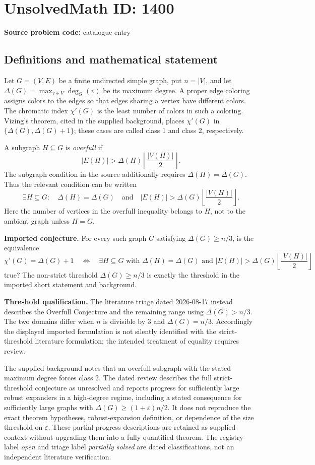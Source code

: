 \documentclass[11pt]{article}
\begin{document}
\section*{UnsolvedMath ID: 1400}
\textbf{Source problem code:} catalogue entry
\subsection{Definitions and mathematical statement}
Let $G=(V,E)$ be a finite undirected simple graph, put $n=|V|$, and let $\Delta(G)=\max_{v\in V}\deg_G(v)$ be its maximum degree. A proper edge coloring assigns colors to the edges so that edges sharing a vertex have different colors. The chromatic index $\chi'(G)$ is the least number of colors in such a coloring. Vizing's theorem, cited in the supplied background, places $\chi'(G)$ in $\{\Delta(G),\Delta(G)+1\}$; these cases are called class 1 and class 2, respectively.

A subgraph $H\subseteq G$ is \emph{overfull} if
\[
 |E(H)|>\Delta(H)\left\lfloor\frac{|V(H)|}{2}\right\rfloor.
\]
The subgraph condition in the source additionally requires $\Delta(H)=\Delta(G)$. Thus the relevant condition can be written
\[
 \exists H\subseteq G:\quad \Delta(H)=\Delta(G)
 \quad\text{and}\quad
 |E(H)|>\Delta(G)\left\lfloor\frac{|V(H)|}{2}\right\rfloor.
\]
Here the number of vertices in the overfull inequality belongs to $H$, not to the ambient graph unless $H=G$.

\textbf{Imported conjecture.} For every such graph $G$ satisfying $\Delta(G)\geq n/3$, is the equivalence
\[
 \chi'(G)=\Delta(G)+1
 \quad\Longleftrightarrow\quad
 \exists H\subseteq G\text{ with }\Delta(H)=\Delta(G)
 \text{ and }|E(H)|>\Delta(G)\left\lfloor\frac{|V(H)|}{2}\right\rfloor
\]
true? The non-strict threshold $\Delta(G)\geq n/3$ is exactly the threshold in the imported short statement and background.

\textbf{Threshold qualification.} The literature triage dated 2026-08-17 instead describes the Overfull Conjecture and the remaining range using $\Delta(G)>n/3$. The two domains differ when $n$ is divisible by $3$ and $\Delta(G)=n/3$. Accordingly the displayed imported formulation is not silently identified with the strict-threshold literature formulation; the intended treatment of equality requires review.

The supplied background notes that an overfull subgraph with the stated maximum degree forces class 2. The dated review describes the full strict-threshold conjecture as unresolved and reports progress for sufficiently large robust expanders in a high-degree regime, including a stated consequence for sufficiently large graphs with $\Delta(G)\geq(1+\varepsilon)n/2$. It does not reproduce the exact theorem hypotheses, robust-expansion definition, or dependence of the size threshold on $\varepsilon$. These partial-progress descriptions are retained as supplied context without upgrading them into a fully quantified theorem. The registry label \emph{open} and triage label \emph{partially solved} are dated classifications, not an independent literature verification.
\end{document}
